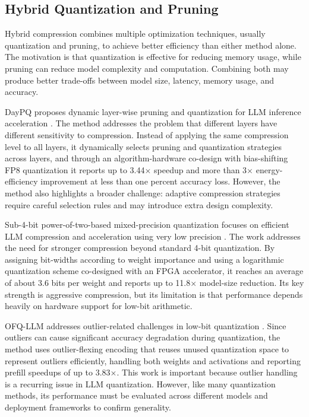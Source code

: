 \subsection{Hybrid Quantization and Pruning}

Hybrid compression combines multiple optimization techniques, usually quantization and pruning, to achieve better efficiency than either method alone. The motivation is that quantization is effective for reducing memory usage, while pruning can reduce model complexity and computation. Combining both may produce better trade-offs between model size, latency, memory usage, and accuracy.

DayPQ proposes dynamic layer-wise pruning and quantization for LLM inference acceleration \cite{xu2026daypq}. The method addresses the problem that different layers have different sensitivity to compression. Instead of applying the same compression level to all layers, it dynamically selects pruning and quantization strategies across layers, and through an algorithm-hardware co-design with bias-shifting FP8 quantization it reports up to 3.44$\times$ speedup and more than 3$\times$ energy-efficiency improvement at less than one percent accuracy loss. However, the method also highlights a broader challenge: adaptive compression strategies require careful selection rules and may introduce extra design complexity.

Sub-4-bit power-of-two-based mixed-precision quantization focuses on efficient LLM compression and acceleration using very low precision \cite{cho2025sub4bit}. The work addresses the need for stronger compression beyond standard 4-bit quantization. By assigning bit-widths according to weight importance and using a logarithmic quantization scheme co-designed with an FPGA accelerator, it reaches an average of about 3.6 bits per weight and reports up to 11.8$\times$ model-size reduction. Its key strength is aggressive compression, but its limitation is that performance depends heavily on hardware support for low-bit arithmetic.

OFQ-LLM addresses outlier-related challenges in low-bit quantization \cite{wang2025ofqllm}. Since outliers can cause significant accuracy degradation during quantization, the method uses outlier-flexing encoding that reuses unused quantization space to represent outliers efficiently, handling both weights and activations and reporting prefill speedups of up to 3.83$\times$. This work is important because outlier handling is a recurring issue in LLM quantization. However, like many quantization methods, its performance must be evaluated across different models and deployment frameworks to confirm generality.

